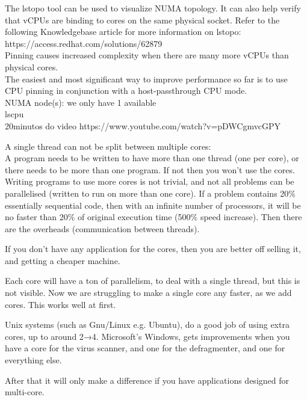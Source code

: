 \documentclass[11pt, a4paper, oneside]{article}
\theoremstyle{definition}
\begin{document}
The lstopo tool can be used to visualize NUMA topology. It can also help verify that vCPUs are binding to cores on the same physical socket. Refer to the following Knowledgebase article for more information on lstopo: https://access.redhat.com/solutions/62879\\

Pinning causes increased complexity when there are many more vCPUs than physical cores. \\

The easiest and most significant way to improve performance so far is to use CPU pinning in conjunction with a host-passthrough CPU mode. \\

NUMA node(s): we only have 1 available\\
lscpu\\
20minutos do video https://www.youtube.com/watch?v=pDWCgmvcGPY



A single thread can not be split between multiple cores:
\\
A program needs to be written to have more than one thread (one per core), or there needs to be more than one program. If not then you won't use the cores.\\

Writing programs to use more cores is not trivial, and not all problems can be parallelised (written to run on more than one core). If a problem contains 20$\%$ essentially sequential code, then with an infinite number of processors, it will be no faster than 20$\%$ of original execution time (500$\%$ speed increase). Then there are the overheads (communication between threads).

If you don't have any application for the cores, then you are better off selling it, and getting a cheaper machine.

Each core will have a ton of parallelism, to deal with a single thread, but this is not visible. Now we are struggling to make a single core any faster, as we add cores. This works well at first.

Unix systems (such as Gnu/Linux e.g. Ubuntu), do a good job of using extra cores, up to around 2→4. Microsoft's Windows, gets improvements when you have a core for the virus scanner, and one for the defragmenter, and one for everything else.

After that it will only make a difference if you have applications designed for multi-core.


\end{document}
